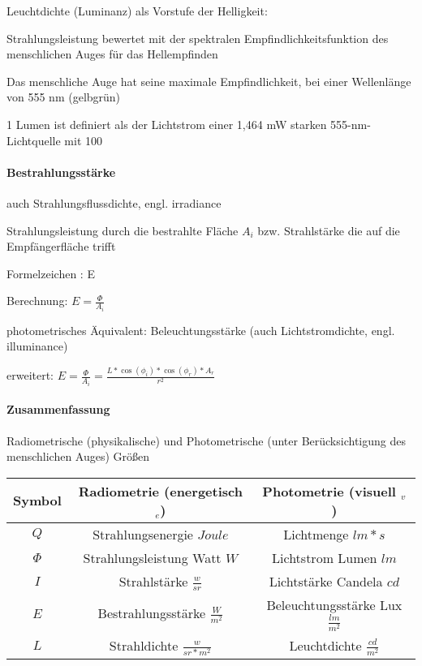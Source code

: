 \documentclass[landscape]{article}
\begin{document}
\begin{multicols}{3}
  Leuchtdichte (Luminanz) als Vorstufe der Helligkeit:
  \begin{itemize*}
    \item Strahlungsleistung bewertet mit der spektralen Empfindlichkeitsfunktion des menschlichen Auges für das Hellempfinden
    \item Das menschliche Auge hat seine maximale Empfindlichkeit, bei einer Wellenlänge von 555 nm (gelbgrün)
    \item 1 Lumen ist definiert als der Lichtstrom einer 1,464 mW starken 555-nm-Lichtquelle mit 100%
  \end{itemize*}
  
  
  \paragraph{Bestrahlungsstärke}
  \begin{itemize*}
    \item auch Strahlungsflussdichte, engl. irradiance
    \item Strahlungsleistung durch die bestrahlte Fläche $A_i$ bzw. Strahlstärke die auf die Empfängerfläche trifft
    \item Formelzeichen : E
    \item Berechnung: $E =\frac{\Phi}{A_i}$
    \item photometrisches Äquivalent: Beleuchtungsstärke (auch Lichtstromdichte, engl. illuminance)
    \item erweitert: $E=\frac{\Phi}{A_i}=\frac{L*\cos(\phi_i)*\cos(\phi_r)*A_r}{r^2}$
  \end{itemize*}
  
  \paragraph{Zusammenfassung}
  Radiometrische (physikalische) und Photometrische (unter Berücksichtigung des menschlichen Auges) Größen
  
  \begin{tabular}{ c | c | c }
    Symbol & Radiometrie (energetisch $_e$)     & Photometrie (visuell $_v$ )             \\ \hline
    $Q$    & Strahlungsenergie $Joule$          & Lichtmenge $lm*s$                       \\
    $\Phi$ & Strahlungsleistung Watt $W$        & Lichtstrom Lumen $lm$                   \\
    $I$    & Strahlstärke $\frac{w}{sr}$        & Lichtstärke Candela $cd$                \\
    $E$    & Bestrahlungsstärke $\frac{W}{m^2}$ & Beleuchtungsstärke Lux $\frac{lm}{m^2}$ \\
    $L$    & Strahldichte $\frac{w}{sr*m^2}$    & Leuchtdichte $\frac{cd}{m^2}$           \\
  \end{tabular}
  

\end{multicols}
\end{document}
